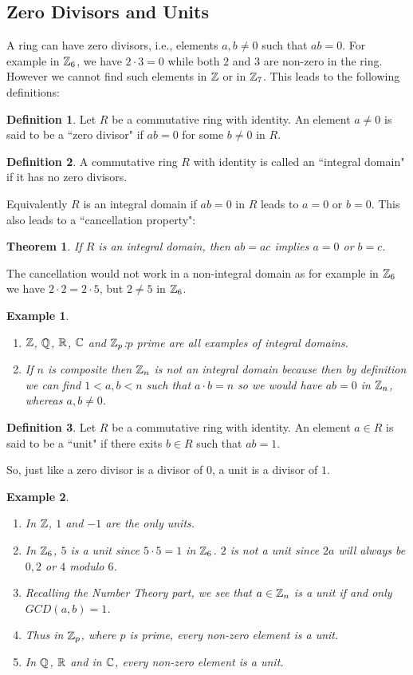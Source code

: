 \documentclass[12pt]{article}
\theoremstyle{plain}
\newtheorem{example}{Example}
\newtheorem{theorem}{Theorem}
\theoremstyle{definition}
\newtheorem{definition}{Definition}
\theoremstyle{remark}
\begin{document}
    \subsection{Zero Divisors and Units}
    A ring can have zero divisors, i.e., elements $a,b \neq 0$ such that $ab=0$. For example in $\mathbb{Z}_6$, we have $2\cdot 3=0$ while both $2$ and $3$ are non-zero in the ring. However we cannot find such elements in $\mathbb{Z}$ or in $\mathbb{Z}_7$. This leads to the following definitions:
    \begin{definition}
    Let $R$ be a commutative ring with identity. An element $a\neq 0$ is said to be a ``zero divisor" if $ab=0$ for some $b\neq 0$ in $R$.
    \end{definition}
    \begin{definition}
    A commutative ring $R$ with identity is called an ``integral domain" if it has no zero divisors.
    \end{definition}
Equivalently $R$ is an integral domain if $ab=0$ in $R$ leads to $a=0$ or $b=0$. This also leads to a ``cancellation property":
\begin{theorem}
If $R$ is an integral domain, then $ab=ac$ implies $a=0$ or $b=c$.
\end{theorem}
The cancellation would not work in a non-integral domain as for example in $\mathbb{Z}_6$ we have $2\cdot 2=2\cdot 5$, but $2\neq 5$ in $\mathbb{Z}_6$.
\begin{example}
\begin{enumerate}
    \item $\mathbb{Z}$, $\mathbb{Q}$, $\mathbb{R}$, $\mathbb{C}$ and $\mathbb{Z}_p$:$p$ prime
 are all examples of integral domains.
 \item If $n$ is composite then $\mathbb{Z}_n$ is not an integral domain because then by definition we can find $1<a,b<n$ such that $a\cdot b=n$ so we would have $ab=0$ in $\mathbb{Z}_n$, whereas $a, b\neq 0$.
 \end{enumerate}
 \end{example}
 \begin{definition}
    Let $R$ be a commutative ring with identity. An element $a\in R$ is said to be a ``unit" if there exits $b\in R$ such that $ab=1$.
 \end{definition}

So,  just like a zero divisor is a divisor of $0$, a unit is a divisor of $1$.

\begin{example}
\begin{enumerate}
    \item In $\mathbb{Z}$, $1$ and $-1$ are the only units.
    \item In $\mathbb{Z}_6$, $5$ is a unit since $5\cdot 5 =1$ in $\mathbb{Z}_6$. $2$ is not a unit since $2a$ will always be $0,2$ or $4$ modulo $6$.
    \item Recalling the Number Theory part, we see that $a\in \mathbb{Z}_n$ is a unit if and only $GCD(a,b)=1$.
    \item Thus in $\mathbb{Z}_p$, where $p$ is prime, every non-zero element is a unit.
    \item In $\mathbb{Q}$, $\mathbb{R}$ and in $\mathbb{C}$, every non-zero element is a unit.
\end{enumerate}
\end{example}
\end{document}
